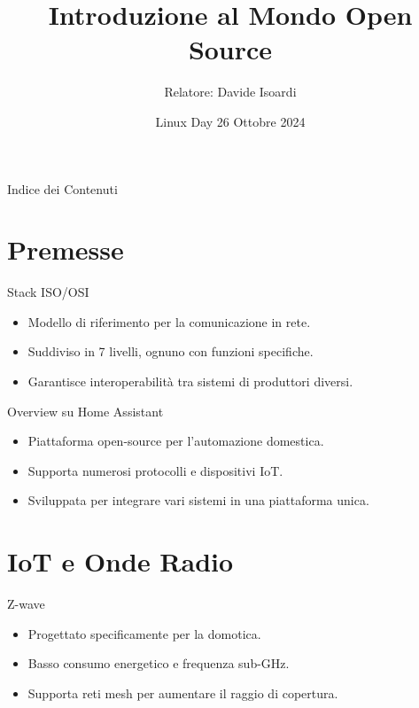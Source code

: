 \documentclass{beamer}
\title{Introduzione al Mondo Open Source}
\author{Relatore: Davide Isoardi}
\date{Linux Day 26 Ottobre 2024}
\begin{document}
	
	\begin{frame}
		\titlepage
	\end{frame}
	
	\begin{frame}{Indice dei Contenuti}
		\tableofcontents
	\end{frame}
	
	\section{Premesse}
	
	\begin{frame}{Stack ISO/OSI}
		\begin{itemize}
			\item Modello di riferimento per la comunicazione in rete.
			\item Suddiviso in 7 livelli, ognuno con funzioni specifiche.
			\item Garantisce interoperabilità tra sistemi di produttori diversi.
		\end{itemize}
	\end{frame}
	
	\begin{frame}{Overview su Home Assistant}
		\begin{itemize}
			\item Piattaforma open-source per l'automazione domestica.
			\item Supporta numerosi protocolli e dispositivi IoT.
			\item Sviluppata per integrare vari sistemi in una piattaforma unica.
		\end{itemize}
	\end{frame}
	
	\section{IoT e Onde Radio}
	
	\begin{frame}{Z-wave}
		\begin{itemize}
			\item Progettato specificamente per la domotica.
			\item Basso consumo energetico e frequenza sub-GHz.
			\item Supporta reti mesh per aumentare il raggio di copertura.
		\end{itemize}
	\end{frame}
	
\end{document}
